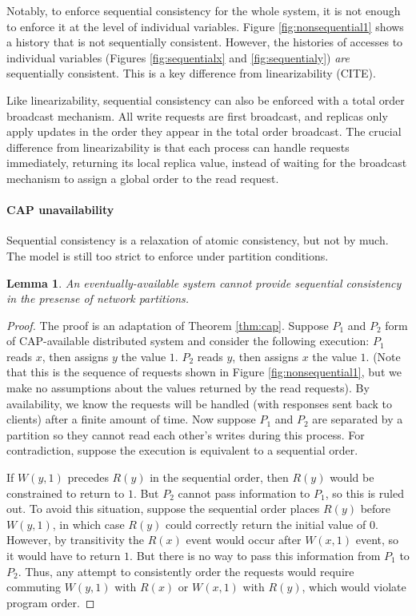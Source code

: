 \documentclass[]             %
{NASA}                       %
\newtheorem{lemma}[theorem]{Lemma}
\theoremstyle{definition}
\begin{document}
Notably, to enforce sequential consistency for the whole system, it is
not enough to enforce it at the level of individual variables. Figure
\ref{fig:nonsequential1} shows a history that is not sequentially
consistent. However, the histories of accesses to individual variables
(Figures \ref{fig:sequentialx} and \ref{fig:sequentialy}) \emph{are}
sequentially consistent. This is a key difference from linearizability
(CITE).

Like linearizability, sequential consistency can also be enforced with a
total order broadcast mechanism. All write requests are first broadcast,
and replicas only apply updates in the order they appear in the total
order broadcast. The crucial difference from linearizability is that
each process can handle requests immediately, returning its local
replica value, instead of waiting for the broadcast mechanism to assign
a global order to the read request.

\hypertarget{cap-unavailability}{%
\paragraph{CAP unavailability}\label{cap-unavailability}}

Sequential consistency is a relaxation of atomic consistency, but not by
much. The model is still too strict to enforce under partition
conditions.

\begin{lemma}
    An eventually-available system cannot provide sequential consistency in the presense of network partitions.
\end{lemma}
\begin{proof}

The proof is an adaptation of Theorem \ref{thm:cap}. Suppose $P_1$ and
$P_2$ form of CAP-available distributed system and consider the
following execution: $P_1$ reads $x$, then assigns $y$ the value
$1$. $P_2$ reads $y$, then assigns $x$ the value $1$. (Note that this
is the sequence of requests shown in Figure \ref{fig:nonsequential1},
but we make no assumptions about the values returned by the read
requests). By availability, we know the requests will be handled (with
responses sent back to clients) after a finite amount of time. Now
suppose $P_1$ and $P_2$ are separated by a partition so they cannot
read each other's writes during this process. For contradiction,
suppose the execution is equivalent to a sequential order.

If $W(y,1)$ precedes $R(y)$ in the sequential order, then $R(y)$ would
be constrained to return to $1$. But $P_2$ cannot pass information to
$P_1$, so this is ruled out. To avoid this situation, suppose the
sequential order places $R(y)$ before $W(y,1)$, in which case $R(y)$
could correctly return the initial value of $0$. However, by
transitivity the $R(x)$ event would occur after $W(x,1)$ event, so it
would have to return $1$. But there is no way to pass this information
from $P_1$ to $P_2$. Thus, any attempt to consistently order the
requests would require commuting $W(y,1)$ with $R(x)$ or $W(x,1)$ with
$R(y)$, which would violate program order.
\end{proof}
\end{document}
